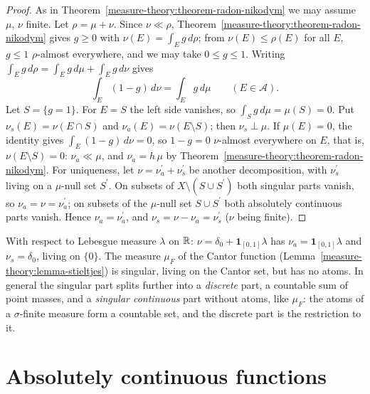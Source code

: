 \begin{proof}
As in Theorem~\ref{measure-theory:theorem-radon-nikodym} we may assume $\mu$, $\nu$ finite. Let $\rho = \mu + \nu$. Since $\nu \ll \rho$, Theorem~\ref{measure-theory:theorem-radon-nikodym} gives $g \geq 0$ with
$\nu(E) = \int_Eg\,d\rho$; from $\nu(E) \leq \rho(E)$ for all $E$, $g \leq 1$ $\rho$-almost everywhere, and we may take $0 \leq g \leq 1$. Writing $\int_Eg\,d\rho = \int_Eg\,d\mu + \int_Eg\,d\nu$ gives
\[
\int_E(1 - g)\,d\nu = \int_Eg\,d\mu \qquad (E \in \mathcal{A}).
\]
Let $S = \{g = 1\}$. For $E = S$ the left side vanishes, so $\int_Sg\,d\mu = \mu(S) = 0$. Put $\nu_s(E) = \nu(E \cap S)$ and $\nu_a(E) = \nu(E \setminus S)$; then $\nu_s \perp \mu$. If $\mu(E) = 0$, the identity gives
$\int_E(1 - g)\,d\nu = 0$, so $1 - g = 0$ $\nu$-almost everywhere on $E$, that is, $\nu(E \setminus S) = 0$: $\nu_a \ll \mu$, and $\nu_a = h\,\mu$ by Theorem~\ref{measure-theory:theorem-radon-nikodym}. For
uniqueness, let $\nu = \nu_a^{\prime} + \nu_s^{\prime}$ be another decomposition, with $\nu_s^{\prime}$ living on a $\mu$-null set $S^{\prime}$. On subsets of $X \setminus (S \cup S^{\prime})$ both singular parts vanish,
so $\nu_a = \nu = \nu_a^{\prime}$; on subsets of the $\mu$-null set $S \cup S^{\prime}$ both absolutely continuous parts vanish. Hence $\nu_a = \nu_a^{\prime}$, and $\nu_s = \nu - \nu_a = \nu_s^{\prime}$ ($\nu$ being finite).
\end{proof}

\begin{example}\label{measure-theory:example-lebesgue-decomposition}
With respect to Lebesgue measure $\lambda$ on $\mathbb{R}$: $\nu = \delta_0 + \mathbf{1}_{[0,1]}\lambda$ has $\nu_a = \mathbf{1}_{[0,1]}\lambda$ and $\nu_s = \delta_0$, living on $\{0\}$. The measure $\mu_F$ of the
Cantor function (Lemma~\ref{measure-theory:lemma-stieltjes}) is singular, living on the Cantor set, but has no atoms. In general the singular part splits further into a \emph{discrete} part, a countable sum of
point masses, and a \emph{singular continuous} part without atoms, like $\mu_F$: the atoms of a $\sigma$-finite measure form a countable set, and the discrete part is the restriction to it.
\end{example}

\section{Absolutely continuous functions}\label{measure-theory:section-absolutely-continuous}

